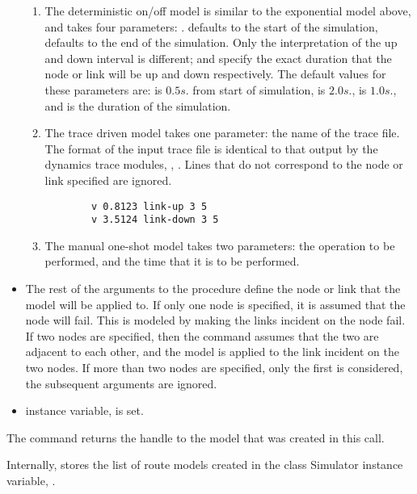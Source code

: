 \begin{list}{---}{}
\begin{itemize}
\begin{enumerate}
\item The deterministic on/off model
is similar to the exponential model above, and  takes four parameters:
.
 defaults to the start of the simulation,
 defaults to the end of the simulation.
Only the interpretation of the up and down interval is different;
 and  specify the exact duration
that the node or link will be up and down respectively.
The default values for these parameters are:
 is $0.5s.$ from start of simulation,
 is $2.0s.$,
 is $1.0s.$, and
 is the duration of the simulation.
\item The trace driven model takes one parameter:
the name of the trace file.
The format of the input trace file is identical to that 
output by the dynamics trace modules, \viz,
.
Lines that do not correspond to the node or link specified are ignored.
{\small
\begin{verbatim}
        v 0.8123 link-up 3 5
        v 3.5124 link-down 3 5
\end{verbatim}
}
\item The manual one-shot model takes two parameters:
the operation to be performed, and the time that it is to be
performed.
\end{enumerate}

\item %
The rest of the arguments to the  procedure
define the node or link that the model will be applied to.
If only one node is specified,
it is assumed that the node will fail.
This is modeled by making the links incident on the node fail.
If two nodes are specified, then the command assumes that
the two are adjacent to each other, and the model is applied to the
link incident on the two nodes.
If more than two nodes are specified, only the first is considered,
the subsequent arguments are ignored.

\item %
  instance variable,  is set.
\end{itemize}
The command returns the handle to the model that was created in this call.

Internally,  stores the list of route models created
in the class Simulator instance variable, .


\end{list}
